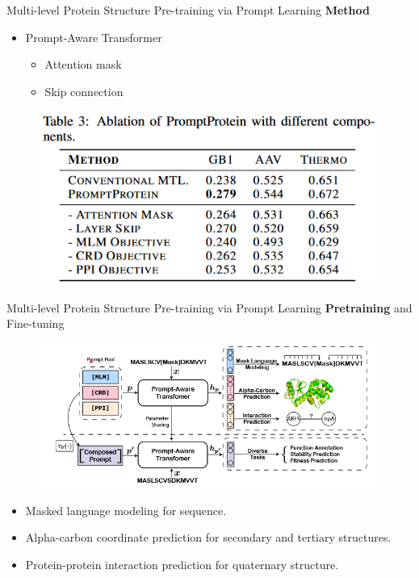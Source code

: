 \documentclass[notheorems, aspectratio=54]{beamer}
\begin{document}


\begin{frame}{Multi-level Protein Structure Pre-training via Prompt Learning}
  \textbf{Method}
  \begin{itemize}
      \item Prompt-Aware Transformer
      \begin{itemize}
        \item Attention mask
        \item Skip connection
      \end{itemize}
  \end{itemize}

  \begin{figure}[!h]
    \centering
    \includegraphics[width=0.6\linewidth]{figures/MPH-tab3.png}
  \end{figure}
\end{frame}

\begin{frame}{Multi-level Protein Structure Pre-training via Prompt Learning}
  \textbf{Pretraining} and Fine-tuning
  
  \begin{figure}[!h]
    \centering
    \includegraphics[width=0.9\linewidth]{figures/MPH-fig2.png}
  \end{figure}

  \begin{itemize}
    \item Masked language modeling for sequence.
    \item Alpha-carbon coordinate prediction for secondary and tertiary structures.
    \item Protein-protein interaction prediction for quaternary structure. 
  \end{itemize}
\end{frame}
\end{document}
